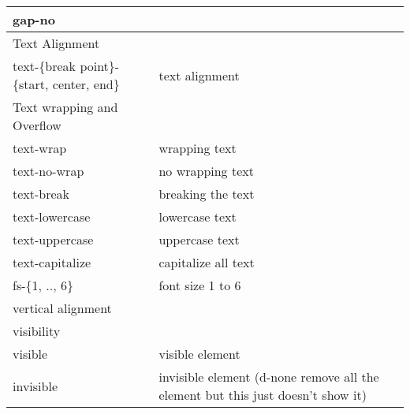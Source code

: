 \documentclass{article}
\begin{document}
\begin{longtable}{ll}
			gap-no                                      &                                                                                 \\ \hline
			Text Alignment                              &                                                                                 \\ \hline
			text-\{break point\}-\{start, center, end\} & text alignment                                                                  \\ \hline
			Text wrapping and Overflow                  &                                                                                 \\ \hline
			text-wrap                                   & wrapping text                                                                   \\
			text-no-wrap                                & no wrapping text                                                                \\
			text-break                                  & breaking the text                                                               \\
			text-lowercase                              & lowercase text                                                                  \\
			text-uppercase                              & uppercase text                                                                  \\
			text-capitalize                             & capitalize all text                                                             \\
			fs-\{1, .., 6\}                             & font size 1 to 6                                                                \\ \hline
			vertical alignment                          &                                                                                 \\ \hline
			visibility                                  &                                                                                 \\ \hline
			visible                                     & visible element                                                                 \\
			invisible                                   & invisible element (d-none remove all the element but this just doesn't show it) \\ \hline

\end{longtable}
\end{document}

